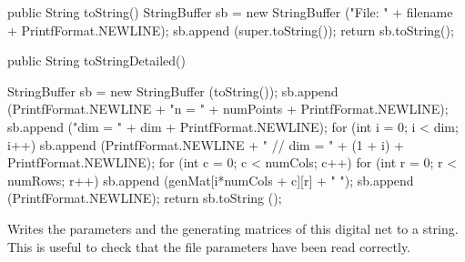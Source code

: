 \begin{code}\begin{hide}

   public String toString() {
      StringBuffer sb = new StringBuffer ("File:   " + filename +
         PrintfFormat.NEWLINE);
      sb.append (super.toString());
      return sb.toString();
   }\end{hide}

   public String toStringDetailed() \begin{hide} {
      StringBuffer sb = new StringBuffer (toString());
      sb.append (PrintfFormat.NEWLINE + "n = " + numPoints  +
                 PrintfFormat.NEWLINE);
      sb.append ("dim = " + dim  + PrintfFormat.NEWLINE);
      for (int i = 0; i < dim; i++) {
         sb.append (PrintfFormat.NEWLINE + " // dim = " + (1 + i) +
                    PrintfFormat.NEWLINE);
         for (int c = 0; c < numCols; c++) {
            for (int r = 0; r < numRows; r++)
                sb.append (genMat[i*numCols + c][r] + " ");
            sb.append (PrintfFormat.NEWLINE);
         }
      }
      return sb.toString ();
   }\end{hide}
\end{code}
\begin{tabb}
    Writes the parameters and the generating matrices of this digital net
    to a string. This is useful to check that the file parameters have been
    read correctly.
\end{tabb}
